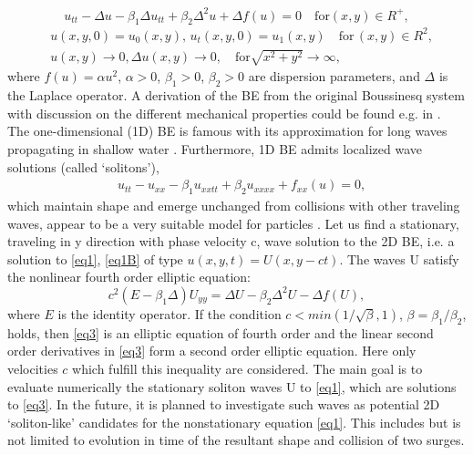 \documentclass[12pt]{article}
\theoremstyle{theorem}
\theoremstyle{defi}
\begin{document}
\begin{equation}
u_{tt} - \Delta u -\beta_1  \Delta u_{tt} +\beta_2 \Delta ^2 u + \Delta f(u)=0 \quad \text{for} (x,y) \in R^{+} ,\label{eq1}
\end{equation}
\begin{equation}\label{eq1B}
\begin{split}
&u(x,y,0)=u_0(x,y), \, u_t(x,y,0)=u_1(x,y)   \quad\text{for} \, (x,y) \in R^2, \\
&u(x,y) \rightarrow 0,  \Delta u(x,y) \rightarrow 0 ,  \quad \text{for}  \sqrt{x^2 + y^2} \rightarrow \infty, 
\end{split}
\end{equation}
where   $f(u)=\alpha u^2$,  $\alpha>0$, $\beta_1>0$, $\beta_2>0$  are dispersion parameters, and $\Delta$ is the Laplace operator. A derivation of the BE from the original Boussinesq system with discussion on the different mechanical properties could be found e.g. in \cite{ref1}. 
The one-dimensional (1D) BE is famous with its approximation for long waves propagating in shallow water \cite{ref2, ref3}. Furthermore, 1D BE admits localized wave solutions (called ‘solitons’), 
\begin{align}
&u_{tt} - u_{xx} -\beta_1  u_{xxtt} +\beta_2 u_{xxxx} + f_{xx}(u) =0, \label{eq2}
\end{align}
which maintain shape and emerge unchanged from collisions with other traveling waves, appear to be a very suitable model for particles \cite{ref4, ref5}.
Let us find a stationary, traveling in y direction with phase velocity c, wave solution to the 2D BE, i.e. a solution to \ref{eq1}, \ref{eq1B} of type $u(x,y,t)=U(x,y - ct)$. The waves U satisfy the nonlinear fourth order elliptic equation:
\begin{equation}
c^2 (E-\beta_1 \Delta) U_{yy} = \Delta U -\beta_2 \Delta^2 U - \Delta f(U), \label{eq3}
\end{equation}
where $E$ is the identity operator. If the condition  $c<min(1/\sqrt{\beta}, 1)$, $\beta = \beta_1/\beta_2$,   holds, then \ref{eq3} is an elliptic equation of fourth order and the linear second order derivatives in \ref{eq3} form a second order elliptic equation. Here only velocities $c$ which fulfill this inequality are considered.
 The main goal is to evaluate numerically the stationary soliton waves U to \ref{eq1}, which are solutions to \ref{eq3}. In the future, it is planned to investigate such waves as potential 2D  ‘soliton-like’ candidates for the nonstationary equation \ref{eq1}. This includes but is not limited to evolution in time of the resultant shape and collision of two surges.
\end{document}
